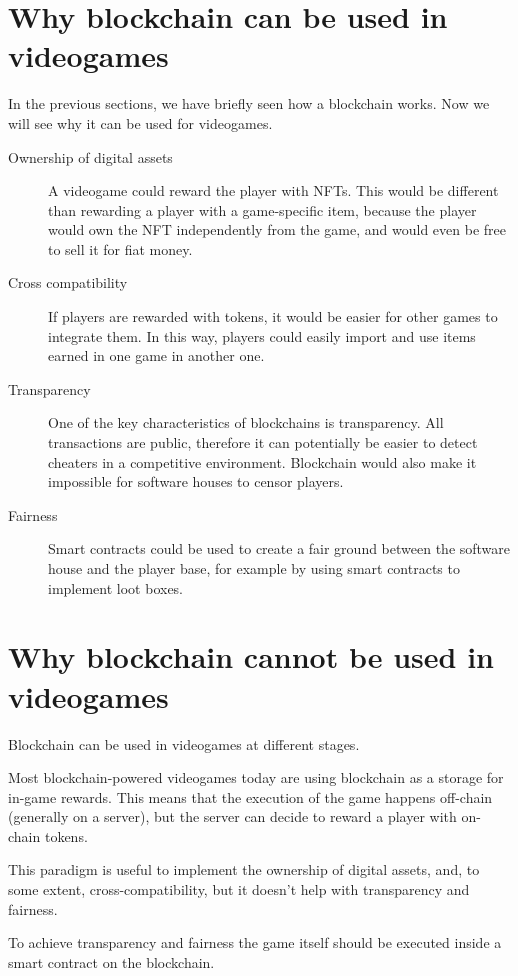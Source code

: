 \documentclass[12pt]{article}
\begin{document}
\section{Why blockchain can be used in videogames} \label{section:wbcbuiv}
In the previous sections, we have briefly seen how a blockchain works. Now we will see why it can be used for videogames.
\begin{description}
    \item[Ownership of digital assets] A videogame could reward the player with NFTs. This would be different than rewarding a player with a game-specific item, because the player would own the NFT independently from the game, and would even be free to sell it for fiat money.
    \item[Cross compatibility] If players are rewarded with tokens, it would be easier for other games to integrate them. In this way, players could easily import and use items earned in one game in another one.
    \item[Transparency] One of the key characteristics of blockchains is transparency. All transactions are public, therefore it can potentially be easier to detect cheaters in a competitive environment. Blockchain would also make it impossible for software houses to censor players.
    \item[Fairness] Smart contracts could be used to create a fair ground between the software house and the player base, for example by using smart contracts to implement loot boxes.  
\end{description}

\section{Why blockchain cannot be used in videogames} \label{section:wbcnbuiv}
Blockchain can be used in videogames at different stages.

Most blockchain-powered videogames today are using blockchain as a storage for in-game rewards. This means that the execution of the game happens off-chain (generally on a server), but the server can decide to reward a player with on-chain tokens.

This paradigm is useful to implement the ownership of digital assets, and, to some extent, cross-compatibility, but it doesn't help with transparency and fairness.

To achieve transparency and fairness the game itself should be executed inside a smart contract on the blockchain.
\end{document}
